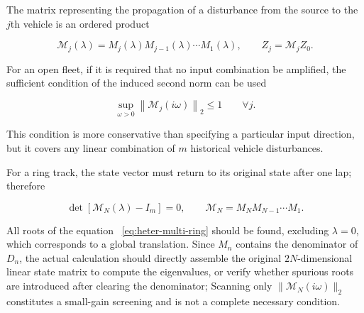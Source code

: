 \documentclass[11pt,a4paper,openany]{book}
\numberwithin{equation}{chapter}
\numberwithin{figure}{chapter}
\numberwithin{table}{chapter}
\begin{document}
The matrix representing the propagation of a disturbance from the source to the $j$th vehicle is an ordered product

\begin{equation}
\mathcal M_j(\lambda)=M_j(\lambda)M_{j-1}(\lambda)\cdots M_1(\lambda),
\qquad Z_j=\mathcal M_jZ_0.
\label{eq:heter-multi-prefix}
\end{equation}

For an open fleet, if it is required that no input combination be amplified, the sufficient condition of the induced second norm can be used

\begin{equation}
\sup_{\omega>0}\left\|\mathcal M_j(i\omega)\right\|_2\le1
\qquad \forall j.
\label{eq:heter-multi-open-condition}
\end{equation}

This condition is more conservative than specifying a particular input direction, but it covers any linear combination of $m$ historical vehicle disturbances.




For a ring track, the state vector must return to its original state after one lap; therefore







\begin{tcolorbox}[keybox,title=\textbf{Closing Equation for a Heterogeneous Circuit with Multiple Leading Vehicles}]
\begin{equation}
\det\!\left[\mathcal M_N(\lambda)-I_m\right]=0,
\qquad
\mathcal M_N=M_NM_{N-1}\cdots M_1.
\label{eq:heter-multi-ring}
\end{equation}
\end{tcolorbox}







All roots of the equation ~\eqref{eq:heter-multi-ring} should be found, excluding $\lambda=0$, which corresponds to a global translation. Since $M_n$ contains the denominator of $D_n$, the actual calculation should directly assemble the original $2N$-dimensional linear state matrix to compute the eigenvalues, or verify whether spurious roots are introduced after clearing the denominator; Scanning only $\|\mathcal M_N(i\omega)\|_2$ constitutes a small-gain screening and is not a complete necessary condition.
\end{document}

